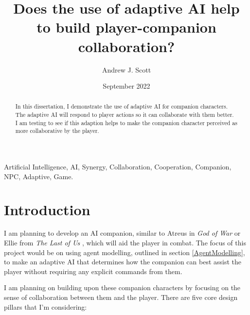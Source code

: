 \documentclass{IEEEtran}
\title{Does the use of adaptive AI help to build player-companion collaboration?}
\author{Andrew J. Scott}
\date{September 2022}
\begin{document}
	\maketitle


\begin{abstract}
In this dissertation, I demonstrate the use of adaptive AI for companion characters. The adaptive AI will respond to player actions so it can collaborate with them better. I am testing to see if this adaption helps to make the companion character perceived as more collaborative by the player.
\end{abstract}

 \begin{IEEEkeywords}
Artificial Intelligence, AI, Synergy, Collaboration, Cooperation, Companion, NPC, Adaptive, Game.
\end{IEEEkeywords}

\section{Introduction}
\label{Intro}

I am planning to develop an AI companion, similar to Atreus in \textit{God of War} \cite{GDCAtreus} or Ellie from \textit{The Last of Us} \cite{GAIP2EllieAI}, which will aid the player in combat. The focus of this project would be on using agent modelling, outlined in section \ref{AgentModelling}, to make an adaptive AI that determines how the companion can best assist the player without requiring any explicit commands from them.

I am planning on building upon these companion characters by focusing on the sense of collaboration between them and the player. There are five core design pillars that I’m considering:
\end{document}
